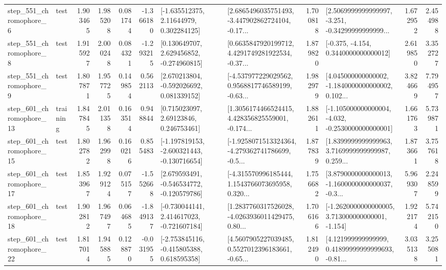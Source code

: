 \begin{tabular}{llrrrrllrlrr}
   step\_551\_chromophore\_6 &      test &      1.903465 &    1.985208 &      0.081744 & -1.366180 &     [-1.635512375, 2.11644979, 0.302284125] &  [2.6865496035751493, -3.447902862724104, -0.17... &       1.700818 &  [2.5069999999999997, -3.251, -0.34299999999999... &            1.672952 &          2.454988 \\
   step\_551\_chromophore\_8 &      test &      1.915927 &    2.000248 &      0.084321 & -1.293215 &    [0.130649707, 2.629456852, -0.274960815] &  [0.6635847920199712, 4.4291749281922534, -0.37... &       1.879820 &               [-0.375, -4.154, 0.3440000000000012] &            2.619850 &          3.352727 \\
   step\_551\_chromophore\_9 &      test &      1.807871 &    1.957725 &      0.149854 &  0.562113 &    [2.670213804, -0.592026692, 0.081339152] &  [-4.537977229029562, 0.9568817746589199, -0.63... &       1.982979 &  [4.045000000000002, -1.1840000000000002, 0.102... &            3.824669 &          7.794957 \\
  step\_601\_chromophore\_13 &  training &      1.847845 &    2.011358 &      0.163514 &  0.948844 &      [0.715023097, 2.69123846, 0.246753461] &  [1.3056174466524415, 4.428356825559001, -0.174... &       1.882611 &  [-1.105000000000004, -4.032, -0.2530000000000001] &            1.661763 &          5.739871 \\
  step\_601\_chromophore\_15 &      test &      1.802782 &    1.962998 &      0.160216 &  0.855483 &  [-1.197819153, -2.600321443, -0.130716654] &  [-1.9258071513324364, -4.279362741786699, -0.5... &       1.877839 &  [1.8399999999999963, 3.7169999999999987, 0.259... &            1.873661 &          3.757618 \\
  step\_601\_chromophore\_17 &      test &      1.853967 &    1.929124 &      0.075157 & -1.552668 &   [2.679593491, -0.546534772, -0.120579786] &  [-4.315570996185444, 1.1543766073695958, 0.320... &       1.756682 &  [3.8790000000000013, -1.1600000000000037, -0.3... &            5.969307 &          2.248599 \\
  step\_601\_chromophore\_18 &      test &      1.902812 &    1.967497 &      0.064685 & -1.849137 &   [-0.730044141, 2.414617023, -0.721607184] &  [1.2837760317526028, -4.0263936011429475, 0.80... &       1.706166 &   [-1.2620000000000005, 3.713000000000001, -1.154] &            1.922174 &          5.742150 \\
  step\_601\_chromophore\_22 &      test &      1.817014 &    1.945885 &      0.128870 & -0.031955 &   [-2.753845116, -0.415805388, 0.618595358] &  [4.5607905227039485, 0.5527012396183661, -0.65... &       1.812490 &  [4.121999999999999, 0.41899999999999693, -0.81... &            3.035138 &          3.255081 \\

\end{tabular}
